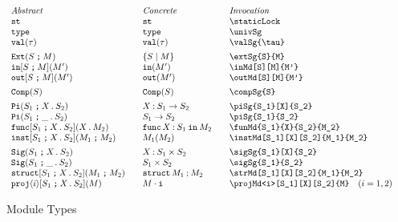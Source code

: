 \documentclass[11pt]{article}
\begin{document}
\begin{figure}

  \begin{small}
    \begin{displaymath}
      \begin{array}{l@{\qquad}l@{\qquad}l@{\qquad}l}
        \textit{Abstract} & \textit{Concrete} & \textit{Invocation} \\
        \staticLock                    & \staticLock*         & \verb|\staticLock|                              \\
        \univSg                        & \univSg*             & \verb|\univSg|                                  \\
        \valSg{\tau}                   & \valSg*{\tau}        & \verb|\valSg{\tau}|                             \\[1ex]
        \extSg{S}{M}                   & \extSg*{S}{M}        & \verb|\extSg{S}{M}|                             \\
        \inMd[S][M]{M'}                & \inMd*{M'}           & \verb|\inMd[S][M]{M'}|                          \\
        \outMd[S][M]{M'}               & \outMd*{M'}          & \verb|\outMd[S][M]{M'}|                         \\[1ex]
        \compSg{S}                     & \compSg*{S}          & \verb|\compSg{S}|                               \\[1ex]
        \piSg{S_1}[X]{S_2}             & \piSg*{S_1}[X]{S_2}  & \verb|\piSg{S_1}[X]{S_2}|                       \\
        \piSg{S_1}{S_2}                & \piSg*{S_1}{S_2}     & \verb|\piSg{S_1}{S_2}| \\
        \funMd{S_1}{X}{S_2}{M_2}       & \funMd*{S_1}{X}{S_2}{M_2} & \verb|\funMd{S_1}{X}{S_2}{M_2}|                      \\
        \instMd[S_1][X][S_2]{M_1}{M_2} & \instMd*{M_1}{M_2}   & \verb|\instMd[S_1][X][S_2]{M_1}{M_2}|           \\[1ex]
        \sigSg{S_1}[X]{S_2}            & \sigSg*{S_1}[X]{S_2} & \verb|\sigSg{S_1}[X]{S_2}|                      \\
        \sigSg{S_1}{S_2}               & \sigSg*{S_1}{S_2}    & \verb|\sigSg{S_1}{S_2}| \\
        \strMd[S_1][X][S_2]{M_1}{M_2}  & \strMd*{M_1}{M_2}    & \verb|\strMd[S_1][X][S_2]{M_1}{M_2}|            \\
        \projMd<i>[S_1][X][S_2]{M}     & \projMd*<i>{M}       & \verb|\projMd<i>[S_1][X][S_2]{M}| \quad (i=1,2)
      \end{array}
    \end{displaymath}
  \end{small}

  \caption{Module Types}
  \label{fig:mod}
\end{figure}
\end{document}
